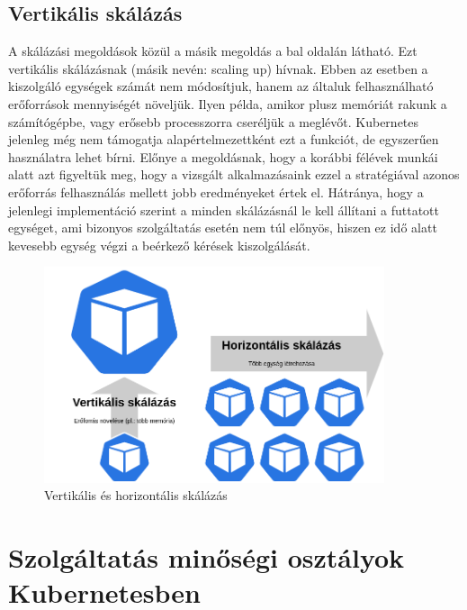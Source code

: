 \subsection{Vertikális skálázás}
A skálázási megoldások közül a másik megoldás a  bal oldalán látható. 
Ezt vertikális skálázásnak (másik nevén: scaling up) hívnak. 
Ebben az esetben a kiszolgáló egységek számát nem módosítjuk, hanem az általuk felhasználható
erőforrások mennyiségét növeljük. Ilyen példa, amikor plusz memóriát rakunk a számítógépbe, vagy
erősebb processzorra cseréljük a meglévőt. Kubernetes jelenleg még nem támogatja alapértelmezettként
ezt a funkciót, de egyszerűen használatra lehet bírni. Előnye a megoldásnak, hogy a korábbi félévek
munkái alatt azt figyeltük meg, hogy a vizsgált alkalmazásaink ezzel a stratégiával azonos erőforrás
felhasználás mellett jobb eredményeket értek el.\citep{bscThesis} Hátránya, hogy a jelenlegi
implementáció szerint a minden skálázásnál le kell állítani a futtatott egységet, ami bizonyos
szolgáltatás esetén nem túl előnyös, hiszen ez idő alatt kevesebb egység végzi a beérkező kérések kiszolgálását.

\begin{figure}[!ht]
\centering
\includegraphics[width=100mm, keepaspectratio]{figures/scaling_types.png}
\caption{Vertikális és horizontális skálázás}
\label{fig:scaling}
\end{figure}


\section{Szolgáltatás minőségi osztályok Kubernetesben}

